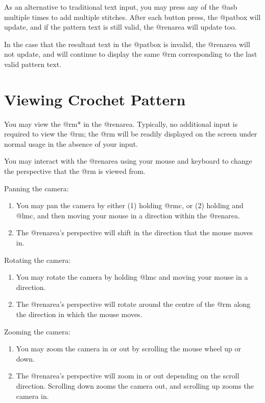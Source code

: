 \documentclass[main.tex]{subfiles}
\begin{document}
As an alternative to traditional text input, you may press any of the @asb multiple times to add multiple stitches. After each button press, the @patbox will update, and if the pattern text is still valid, the @renarea will update too.

In the case that the resultant text in the @patbox is invalid, the @renarea will not update, and will continue to display the same @rm corresponding to the last valid pattern text.

\section{Viewing Crochet Pattern}

You may view the @rm* in the @renarea. Typically, no additional input is required to view the @rm; the @rm will be readily displayed on the screen under normal usage in the absence of your input.

You may interact with the @renarea using your mouse and keyboard to change the perspective that the @rm is viewed from.

Panning the camera:
\begin{enumerate}
\item You may pan the camera by either (1) holding @rmc, or (2) holding  and @lmc, and then moving your mouse in a direction within the @renarea.
\item The @renarea's perspective will shift in the direction that the mouse moves in.
\end{enumerate}

Rotating the camera:
\begin{enumerate}
\item You may rotate the camera by holding @lmc and moving your mouse in a direction.
\item The @renarea's perspective will rotate around the centre of the @rm along the direction in which the mouse moves.
\end{enumerate}

Zooming the camera:
\begin{enumerate}
\item You may zoom the camera in or out by scrolling the mouse wheel up or down. 
\item The @renarea's perspective will zoom in or out depending on the scroll direction. Scrolling down zooms the camera out, and scrolling up zooms the camera in.
\end{enumerate}
\end{document}
